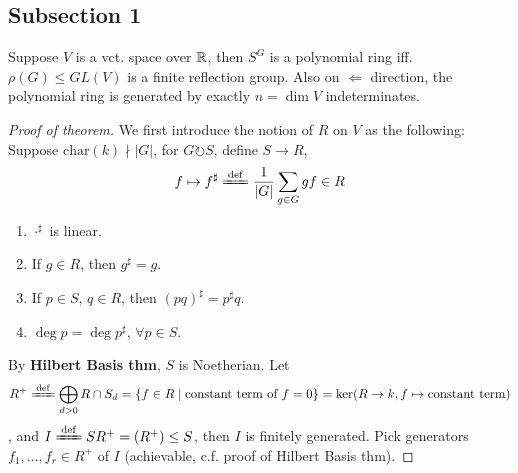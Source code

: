 \documentclass[12pt]{extarticle}
\begin{document}
    \subsection{Subsection 1}
    \lipsum[1]
    \begin{theorem}\label{big theorem on polynomial invariants}
        Suppose $V$ is a vct. space over $\mathbb{R}$, then $S^G$ is a polynomial ring iff. $\rho(G)\le GL(V)$ is a finite reflection group. Also on $\Leftarrow$ direction, the polynomial ring is generated by exactly $n = \dim V$ indeterminates.
    \end{theorem}
    \begin{proof}[Proof of theorem]
        We first introduce the notion of  $R$ on $V$ as the following:
        Suppose $\mathrm{char}(k)\nmid |G|$, for $G\circlearrowright S$, define $S\to R$, $$f\mapsto f^\sharp \ddef \frac{1}{|G|} \sum_{g\in G} gf\in R$$
            \begin{enumerate}
                \item $\cdot^\sharp$ is linear.
                \item If $g\in R$, then $g^\sharp = g$.
                \item If $p\in S$, $q\in R$, then $(pq)^\sharp = p^\sharp q$.
                \item $\deg p = \deg p^\sharp$, $\forall p\in S$.
            \end{enumerate}
        By \textbf{\color{allanblue}Hilbert Basis thm}, $S$ is Noetherian. Let $$R^+ \ddef \bigoplus_{d > 0} R\cap S_d = \{f\in R \mid \text{constant term of $f = 0$}\} = \ker(R\to k, f\mapsto \text{constant term})$$, and $I\ddef SR^+ = (R^+) \le S$, then $I$ is finitely generated. Pick generators $f_1, \dots, f_r\in R^+$ of $I$ (achievable, c.f. proof of Hilbert Basis thm).


\end{proof}
\end{document}
